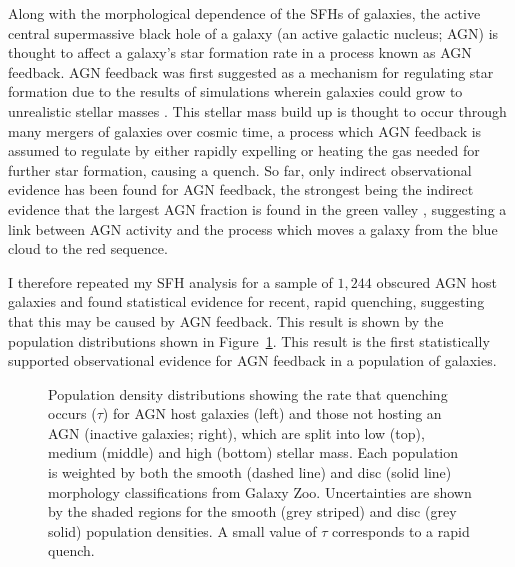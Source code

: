 \documentclass[12pt, usenatbib]{article}
\begin{document}
Along with the morphological dependence of the SFHs of galaxies, the active central supermassive black hole of a galaxy (an active galactic nucleus; AGN) is thought to affect a galaxy's star formation rate in a process known as AGN feedback. AGN feedback was first suggested as a mechanism for regulating star formation due to the results of simulations wherein galaxies could grow to unrealistic stellar masses \citep{silk98, bower06, croton06, somerville08}. This stellar mass build up is thought to occur through many mergers of galaxies over cosmic time, a process which AGN feedback is assumed to regulate by either rapidly expelling or heating the gas needed for further star formation, causing a quench. So far, only indirect observational evidence has been found for AGN feedback, the strongest being the indirect evidence that the largest AGN fraction is found in the green valley \citep{cowie08, hickox09, schawinski10}, suggesting a link between AGN activity and the process which moves a galaxy from the blue cloud to the red sequence.

I therefore repeated my SFH analysis for a sample of $1,244$ obscured AGN host galaxies and found statistical evidence for recent, rapid quenching, suggesting that this may be caused by AGN feedback. This result is shown by the population distributions shown in Figure~\ref{fig:agnfeedback}. This result is the first statistically supported observational evidence for AGN feedback in a population of galaxies. 

\begin{figure}[t]
\caption{Population density distributions showing the rate that quenching occurs ($\tau$) for AGN host galaxies (left) and those not hosting an AGN (inactive galaxies; right), which are split into low (top), medium (middle) and high (bottom) stellar mass. Each population is weighted by both the smooth (dashed line) and disc (solid line) morphology classifications from Galaxy Zoo. Uncertainties  are shown by the shaded regions for the smooth (grey striped) and disc (grey solid) population densities. A small value of $\tau$ corresponds to a rapid quench.}
\label{fig:agnfeedback}
\end{figure}
\end{document}
